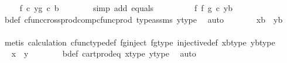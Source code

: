 \begin{isabellebody}
\ \isamarkupfalse%
\ {\isachardoublequoteopen}{\isachardot}{\kern0pt}{\isachardot}{\kern0pt}{\isachardot}{\kern0pt}\ {\isacharequal}{\kern0pt}\ {\isasymlangle}f\ {\isasymcirc}\isactrlsub c\ y{\isacharcomma}{\kern0pt}g\ {\isasymcirc}\isactrlsub c\ b{\isasymrangle}{\isachardoublequoteclose}\isanewline
\ \ \ \ \ \ \isamarkupfalse%
\ {\isacharparenleft}{\kern0pt}simp\ add{\isacharcolon}{\kern0pt}\ equals{\isacharparenright}{\kern0pt}\isanewline
\ \ \ \ \isamarkupfalse%
\ \isamarkupfalse%
\ {\isachardoublequoteopen}{\isachardot}{\kern0pt}{\isachardot}{\kern0pt}{\isachardot}{\kern0pt}\ {\isacharequal}{\kern0pt}\ {\isacharparenleft}{\kern0pt}f\ {\isasymtimes}\isactrlsub f\ g{\isacharparenright}{\kern0pt}\ {\isasymcirc}\isactrlsub c\ {\isasymlangle}y{\isacharcomma}{\kern0pt}b{\isasymrangle}{\isachardoublequoteclose}\isanewline
\ \ \ \ \ \ \isamarkupfalse%
\ b{\isacharunderscore}{\kern0pt}def\ cfunc{\isacharunderscore}{\kern0pt}cross{\isacharunderscore}{\kern0pt}prod{\isacharunderscore}{\kern0pt}comp{\isacharunderscore}{\kern0pt}cfunc{\isacharunderscore}{\kern0pt}prod\ type{\isacharunderscore}{\kern0pt}assms\ y{\isacharunderscore}{\kern0pt}type{}\ \isamarkupfalse%
\ auto\isanewline
\ \ \ \ \isamarkupfalse%
\ \isamarkupfalse%
\ {\isachardoublequoteopen}{\isasymlangle}x{\isacharcomma}{\kern0pt}b{\isasymrangle}\ {\isacharequal}{\kern0pt}\ {\isasymlangle}y{\isacharcomma}{\kern0pt}b{\isasymrangle}{\isachardoublequoteclose}\isanewline
\ \ \ \ \ \ \isamarkupfalse%
\ {\isacharparenleft}{\kern0pt}metis\ calculation\ cfunc{\isacharunderscore}{\kern0pt}type{\isacharunderscore}{\kern0pt}def\ fg{\isacharunderscore}{\kern0pt}inject\ fg{\isacharunderscore}{\kern0pt}type\ injective{\isacharunderscore}{\kern0pt}def\ xb{\isacharunderscore}{\kern0pt}type\ yb{\isacharunderscore}{\kern0pt}type{\isacharparenright}{\kern0pt}\isanewline
\ \ \ \ \isamarkupfalse%
\ \isamarkupfalse%
\ {\isachardoublequoteopen}x\ {\isacharequal}{\kern0pt}\ y{\isachardoublequoteclose}\isanewline
\ \ \ \ \ \ \isamarkupfalse%
\ b{\isacharunderscore}{\kern0pt}def\ cart{\isacharunderscore}{\kern0pt}prod{\isacharunderscore}{\kern0pt}eq{}\ x{\isacharunderscore}{\kern0pt}type{}\ y{\isacharunderscore}{\kern0pt}type{}\ \isamarkupfalse%
\ auto\isanewline
\ \ \isamarkupfalse%
\isanewline
{}\isamarkupfalse%
\isanewline
\ \ \isamarkupfalse%

\end{isabellebody}
